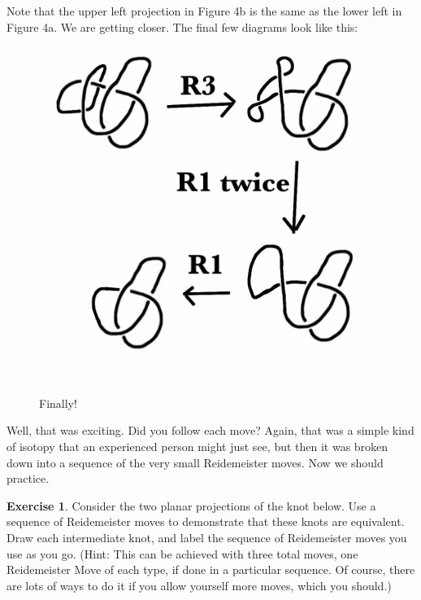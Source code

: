 \documentclass[12pt,letterpaper]{article}
\theoremstyle{definition}
\newtheorem{exercise}[question]{Exercise}
\begin{document}
Note that the upper left projection in Figure 4b is the same as the lower left in Figure 4a.
We are getting closer.
The final few diagrams look like this:



\begin{figure}[h]
    \centering
    \includegraphics[width=.4\textwidth]{knotpics/trefoil-better3.png}
    \caption{Finally!}
\end{figure}

Well, that was exciting.
Did you follow each move?
Again, that was a simple kind of isotopy that an experienced person might just see, but then it was broken down into a sequence of the very small Reidemeister moves.
Now we should practice.

\begin{exercise} Consider the two planar projections of the knot below.
Use a sequence of Reidemeister moves to demonstrate that these knots are equivalent.
Draw each intermediate knot, and label the sequence of Reidemeister moves you use as you go.
(Hint: This can be achieved with three total moves, one Reidemeister Move of each type, if done in a particular sequence. Of course, there are lots of ways to do it if you allow yourself more moves, which you should.)
\end{exercise}
\end{document}
